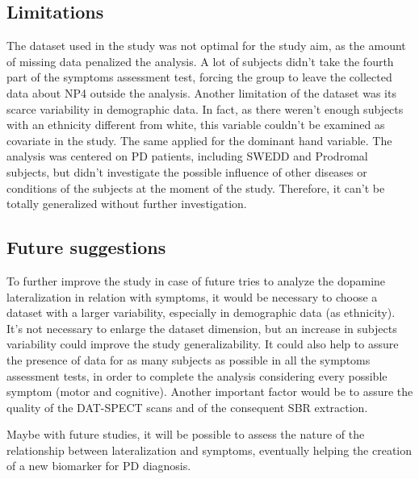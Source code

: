 \documentclass[]{article}
\begin{document}
\begin{multicols}{2}
\subsection{Limitations}

The dataset used in the study was not optimal for the study aim, as the amount of missing data penalized the analysis. A lot of subjects didn't take the fourth part of the symptoms assessment test, forcing the group to leave the collected data about NP4 outside the analysis. 
Another limitation of the dataset was its scarce variability in demographic data. In fact, as there weren't enough subjects with an ethnicity different from white, this variable couldn't be examined as covariate in the study. The same applied for the dominant hand variable. 
The analysis was centered on PD patients, including SWEDD and Prodromal subjects, but didn't investigate the possible influence of other diseases or conditions of the subjects at the moment of the study. Therefore, it can't be totally generalized without further investigation. 

\subsection{Future suggestions}

To further improve the study in case of future tries to analyze the dopamine lateralization in relation with symptoms, it would be necessary to choose a dataset with a larger variability, especially in demographic data (as ethnicity). It's not necessary to enlarge the dataset dimension, but an increase in subjects variability could improve the study generalizability.
It could also help to assure the presence of data for as many subjects as possible in all the symptoms assessment tests, in order to complete the analysis considering every possible symptom (motor and cognitive). 
Another important factor would be to assure the quality of the DAT-SPECT scans and of the consequent SBR extraction. 

Maybe with future studies, it will be possible to assess the nature of the relationship between lateralization and symptoms, eventually helping the creation of a new biomarker for PD diagnosis. 


\end{multicols}

\printbibliography
\end{document}
